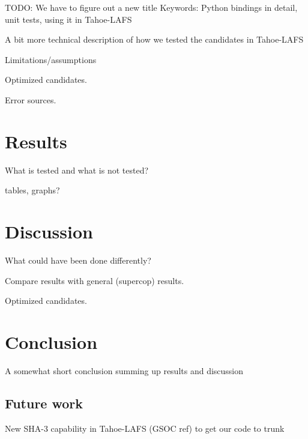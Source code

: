 \documentclass[english,12pt,a4paper]{book}
\begin{document}
TODO: We have to figure out a new title
Keywords: Python bindings in detail, unit tests, using it in Tahoe-LAFS

A bit more technical description of how we tested the candidates in Tahoe-LAFS

Limitations/assumptions

Optimized candidates.

Error sources.


\chapter{Results}

What is tested and what is not tested?

tables, graphs?


\chapter{Discussion}

What could have been done differently?

Compare results with general (supercop) results.

Optimized candidates.

\cite{s_nistround2}


\chapter{Conclusion}

A somewhat short conclusion summing up results and discussion

\section{Future work}

New SHA-3 capability in Tahoe-LAFS (GSOC ref) to get our code to trunk





\appendix
\appendixpage
\addappheadtotoc

\end{document}
